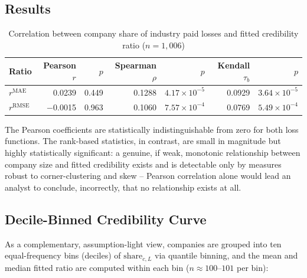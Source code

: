 \documentclass[11pt]{article}
\newcommand{\rmae}{r^{\text{MAE}}}
\newcommand{\rrmse}{r^{\text{RMSE}}}
\begin{document}
\subsection{Results}

\begin{table}[h]
\centering
\caption{Correlation between company share of industry paid losses and fitted credibility ratio ($n=1{,}006$)}
\begin{tabular}{lrrrrrr}
\toprule
Ratio & Pearson $r$ & $p$ & Spearman $\rho$ & $p$ & Kendall $\tau_b$ & $p$ \\
\midrule
$\rmae$  & 0.0239  & 0.449 & 0.1288 & $4.17\times10^{-5}$ & 0.0929 & $3.64\times10^{-5}$ \\
$\rrmse$ & $-$0.0015 & 0.963 & 0.1060 & $7.57\times10^{-4}$ & 0.0769 & $5.49\times10^{-4}$ \\
\bottomrule
\end{tabular}
\end{table}

The Pearson coefficients are statistically indistinguishable from zero for both loss functions.
The rank-based statistics, in contrast, are small in magnitude but highly statistically
significant: a genuine, if weak, monotonic relationship between company size and fitted
credibility exists and is detectable only by measures robust to corner-clustering and skew --
Pearson correlation alone would lead an analyst to conclude, incorrectly, that no relationship
exists at all.

\subsection{Decile-Binned Credibility Curve}

As a complementary, assumption-light view, companies are grouped into ten equal-frequency bins
(deciles) of $\text{share}_{c,L}$ via quantile binning, and the mean and median fitted ratio are
computed within each bin ($n \approx 100$--$101$ per bin):
\end{document}
